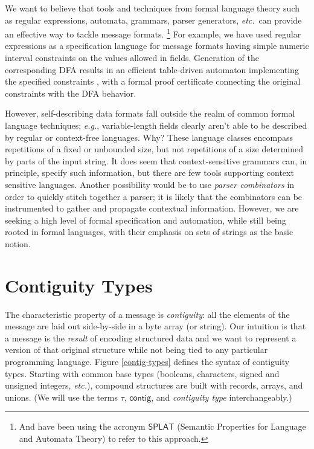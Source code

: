 \documentclass[sigplan,10pt,anonymous,review]{acmart}\settopmatter{printfolios=true,printccs=false,printacmref=false}
\newcommand{\eg}{\textit{e.g.}}
\newcommand{\etc}{\textit{etc.}}
\newcommand{\konst}[1]{\ensuremath{\mathsf{#1}}}
\begin{document}
We want to believe that tools and techniques from formal language
theory such as regular expressions, automata, grammars, parser
generators, \etc\, can provide an effective way to tackle message
formats. \footnote{And have been using the acronym \konst{SPLAT}
  (Semantic Properties for Language and Automata Theory) to refer to
  this approach.} For example, we have used regular expressions as a
specification language for message formats having simple numeric
interval constraints on the values allowed in fields. Generation of
the corresponding DFA results in an efficient table-driven automaton
implementing the specified constraints \cite{}, with a formal proof
certificate connecting the original constraints with the DFA behavior.

However, self-describing data formats fall outside the realm of common
formal language techniques; \eg, variable-length fields clearly aren't
able to be described by regular or context-free languages. Why? These
language classes encompass repetitions of a fixed or unbounded size,
but not repetitions of a size determined by parts of the input
string. It does seem that context-sensitive grammars can, in
principle, specify such information, but there are few tools
supporting context sensitive languages. Another possibility would be
to use \emph{parser combinators} in order to quickly stitch together a
parser; it is likely that the combinators can be instrumented to
gather and propagate contextual information. However, we are seeking a
high level of formal specification and automation, while still being
rooted in formal languages, with their emphasis on sets of strings as
the basic notion.

\section {Contiguity Types}

The characteristic property of a message is \emph{contiguity}: all the
elements of the message are laid out side-by-side in a byte array (or
string). Our intuition is that a message is the \emph{result} of
encoding structured data and we want to represent a version of that
original structure while not being tied to any particular programming
language. Figure \ref{contig-types} defines the syntax of contiguity
types. Starting with common base types (booleans, characters, signed
and unsigned integers, \etc), compound structures are built with
records, arrays, and unions. (We will use the terms $\tau$,
\konst{contig}, and \emph{contiguity type} interchangeably.)
\end{document}
